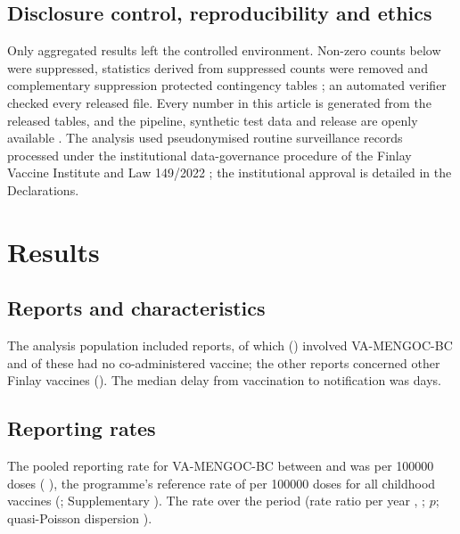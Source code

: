 \documentclass[11pt]{article}
\begin{document}
\subsection{Disclosure control, reproducibility and ethics}\label{sec:m-sdc}
Only aggregated results left the controlled environment. Non-zero counts below \VMinCell{}
were suppressed, statistics derived from suppressed counts were removed and
complementary suppression protected contingency tables \cite{Hundepool2012}; an automated
verifier checked every released file. Every number in this article is generated from the
released tables, and the pipeline, synthetic test data and release are openly available
\cite{Wilkinson2016}. The analysis used pseudonymised routine surveillance records processed
under the institutional data-governance procedure of the Finlay Vaccine Institute and Law
149/2022 \cite{Ley149}; the institutional approval is detailed in the Declarations.

\section{Results}\label{sec:results}

\subsection{Reports and characteristics}\label{sec:r-reports}
The analysis population included \PONReports{} reports, of which \PONTarget{} (\POPctTarget)
involved VA-MENGOC-BC and \PONTargetOnly{} of these had no co-administered vaccine; the other
\PONOther{} reports concerned other Finlay vaccines
(). The median delay from vaccination to notification was
\PODelayMedian{} days.

\begin{table}[tbp]
\centering\small
\caption{Characteristics of AEFI reports involving VA-MENGOC-BC and other Finlay vaccines. Values are
$n$ (\%) unless stated otherwise; counts below \VMinCell{} are suppressed, and [c] marks
complementary suppression that prevents their recovery by subtraction.}
\label{tab:characteristics}
\POTableCharacteristics
\end{table}

\subsection{Reporting rates}\label{sec:r-rates}
The pooled reporting rate for VA-MENGOC-BC between \PORateFirstYear{} and \PORateLastYear{} was
\POPooledRate{} per \num{100000} doses (\CI{} \POPooledRateCI), \PORateVsExpected{} the programme's
reference rate of \POExpectedRate{} per \num{100000} doses for all childhood vaccines
(; Supplementary ). The rate \POTrendWord{} over the period (rate ratio
per year \POTrendRR, \CI{} \POTrendRRCI; $p$\POTrendP; quasi-Poisson dispersion
\PODispersion).
\end{document}
